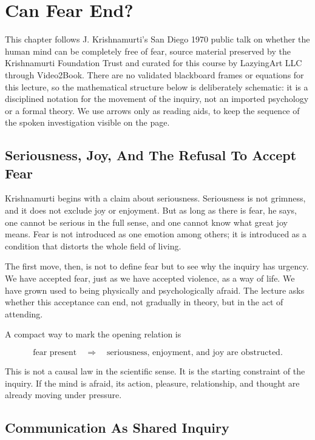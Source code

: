 \chapter{Can Fear End?}

This chapter follows J. Krishnamurti's San Diego 1970 public talk on whether the human mind can be completely free of fear, source material preserved by the Krishnamurti Foundation Trust and curated for this course by LazyingArt LLC through Video2Book. There are no validated blackboard frames or equations for this lecture, so the mathematical structure below is deliberately schematic: it is a disciplined notation for the movement of the inquiry, not an imported psychology or a formal theory. We use arrows only as reading aids, to keep the sequence of the spoken investigation visible on the page.

\section{Seriousness, Joy, And The Refusal To Accept Fear}

Krishnamurti begins with a claim about seriousness. Seriousness is not grimness, and it does not exclude joy or enjoyment. But as long as there is fear, he says, one cannot be serious in the full sense, and one cannot know what great joy means. Fear is not introduced as one emotion among others; it is introduced as a condition that distorts the whole field of living.

The first move, then, is not to define fear but to see why the inquiry has urgency. We have accepted fear, just as we have accepted violence, as a way of life. We have grown used to being physically and psychologically afraid. The lecture asks whether this acceptance can end, not gradually in theory, but in the act of attending.

A compact way to mark the opening relation is

\begin{equation}
\text{fear present}
\quad \Longrightarrow \quad
\text{seriousness, enjoyment, and joy are obstructed}.
\end{equation}

This is not a causal law in the scientific sense. It is the starting constraint of the inquiry. If the mind is afraid, its action, pleasure, relationship, and thought are already moving under pressure.

\section{Communication As Shared Inquiry}

